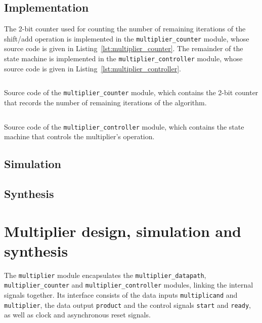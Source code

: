\documentclass[a4paper]{article}
\newcommand{\modulelisting}[3]{
  \begin{listing}[p]
    \linespread{.9}\inputminted[fontsize=\scriptsize,linenos]{systemverilog}{#2}
    \centering\caption{#3}
    \label{lst:#1}
  \end{listing}
}
\begin{document}
\subsection{Implementation}
\label{sec:seq:impl}

The 2-bit counter used for counting the number of remaining iterations of the shift/add operation is implemented in the \texttt{multiplier\_counter} module, whose source code is given in Listing~\ref{lst:multiplier_counter}. The remainder of the state machine is implemented in the \texttt{multiplier\_controller} module, whose source code is given in Listing~\ref{lst:multiplier_controller}.

\modulelisting{multiplier_counter}{../src/multiplier/multiplier_counter.sv}
  {Source code of the \texttt{multiplier\_counter} module, which contains the 2-bit counter that records the number of remaining iterations of the algorithm.}

\modulelisting{multiplier_controller}{../src/multiplier/multiplier_controller.sv}
  {Source code of the \texttt{multiplier\_controller} module, which contains the state machine that controls the multiplier's operation.}

\subsection{Simulation}
\label{sec:seq:sim}


\subsection{Synthesis}
\label{sec:seq:synth}


\section{Multiplier design, simulation and synthesis}
\label{sec:mult}

The \texttt{multiplier} module encapsulates the \texttt{multiplier\_datapath}, \texttt{multiplier\_counter} and \texttt{multiplier\_controller} modules, linking the internal signals together. Its interface consists of the data inputs \texttt{multiplicand} and \texttt{multiplier}, the data output \texttt{product} and the control signals \texttt{start} and \texttt{ready}, as well as clock and asynchronous reset signals.
\end{document}
